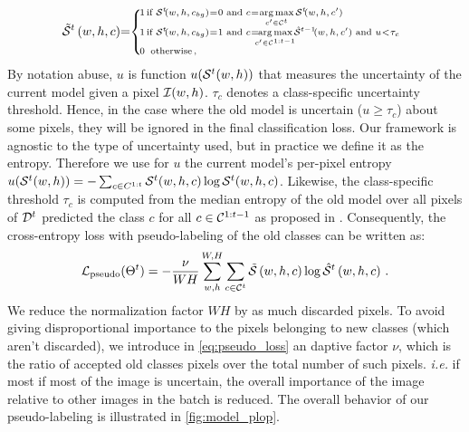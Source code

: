 \begin{equation}
    \scriptsize
    \tilde \mcS^{t}\left(w,h,c\right)\mkern-5mu = \mkern-5mu \left\{\begin{array}{ll}
        \mkern-14mu 1 \mkern-27mu & \mkern-8mu \text { if } \mcS^{t} \mkern-4mu (w,h,c_{bg})\mkern-4mu = \mkern-4mu 0 \text { and } c \mkern-4mu = \mkern-4mu \argmax \limits_{c' \in \mathcal{C}^{t}} \mcS^{t} \mkern-4mu (w,h,c')                                                                         \\
        \mkern-14mu 1 \mkern-27mu & \mkern-8mu \text { if } \mcS^{t} \mkern-4mu (w,h,c_{bg}) \mkern-4mu = \mkern-4mu 1 \text { and } c \mkern-4mu = \mkern-12mu \argmax \limits_{c' \in \mathcal{C}^{1:t-1}} \mkern-6mu \hat \mcS^{t-1} \mkern-4mu (w,h,c') \text{ and } u \mkern-4mu < \mkern-4mu \tau_{c} \\
        \mkern-14mu 0 \mkern-27mu & \mkern-4mu \,\text { otherwise\,, }                                                                                                                                                                                                                                     \\
    \end{array}\right.
    \label{eq:pseudo_bis_uncertain}
\end{equation}
%
By notation abuse, $u$ is function $u(\mathcal{S}^t(w, h))$ that measures the uncertainty of the current
model given a pixel $\mathcal{I}(w,h)$. $\tau_{c}$ denotes a class-specific uncertainty threshold. Hence,
in the case where the old model is uncertain ($u \ge \tau_c$) about some pixels, they will be
ignored in the final classification loss. Our framework is agnostic to the type of uncertainty used,
but in practice we define it as the entropy. Therefore we use for $u$ the current model's per-pixel
entropy $u(\mathcal{S}^t(w, h)) = -\sum_{c \in C^{1:t}} \mathcal{S}^t(w, h, c) \log \mathcal{S}^t(w, h, c)$. Likewise,
the class-specific threshold $\tau_c$ is computed from the median entropy of the old model over all
pixels of $\mathcal{D}^t$ predicted the class $c$ for all $c \in \mathcal{C}^{1:t-1}$ as proposed in
\citep{saporta2020esl}. Consequently, the cross-entropy loss with pseudo-labeling of the old classes
can be written as:
%
\begin{equation}
    \mathcal{L}_\text{pseudo}(\Theta^t)=- \frac{\nu}{WH} \sum_{w,h}^{W,H} \sum_{c \in \mathcal{C}^{t}} \tilde {\mathcal{S}}\left(w,h,c\right) \log \hat {\mathcal{S}}^{t}\left(w,h,c\right)\,.
    \label{eq:pseudo_loss}
\end{equation}
%
We reduce the normalization factor $WH$ by as much discarded pixels. To avoid giving disproportional
importance to the pixels belonging to new classes (which aren't discarded), we introduce in
\autoref{eq:pseudo_loss} an daptive factor $\nu$, which is the ratio of accepted old classes pixels
over the total number of such pixels. \textit{i.e.} if most if most of the image is uncertain, the
overall importance of the image relative to other images in the batch is reduced. The overall
behavior of our pseudo-labeling is illustrated in \autoref{fig:model_plop}.

